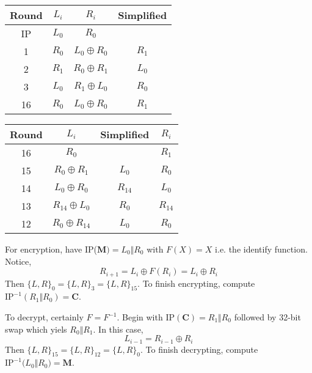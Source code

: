 \documentclass[../hw_sols.tex]{subfiles}
\begin{document}
\begin{description}
\begin{solution}
\begin{multicols}{2}
	\begin{center}
	\begin{tabular}{ c | c | c | c }
		\textbf{Round} & $L_i$ & $R_i$ & Simplified \\[2pt]  %
		\hline
		IP & $L_0$ & $R_0$            &       \\[5pt]
		 1 & $R_0$ & $L_0 \oplus R_0$ & $R_1$ \\[5pt]
		 2 & $R_1$ & $R_0 \oplus R_1$ & $L_0$ \\[5pt]
		 3 & $L_0$ & $R_1 \oplus L_0$ & $R_0$ \\[5pt]
		16 & $R_0$ & $L_0 \oplus R_0$ & $R_1$
	\end{tabular}
	\end{center}

	\begin{center}
	\begin{tabular}{ c | c | c | c }
		\textbf{Round} & $L_i$ & Simplified & $R_i$ \\[2pt]  %
		\hline
		16 &               $R_0$ &          & $R_1$    \\[5pt]
		15 &    $R_0 \oplus R_1$ &    $L_0$ & $R_0$    \\[5pt]
		14 &    $L_0 \oplus R_0$ & $R_{14}$ & $L_0$    \\[5pt]
		13 & $R_{14} \oplus L_0$ &    $R_0$ & $R_{14}$ \\[5pt]
		12 & $R_0 \oplus R_{14}$ &    $L_0$ & $R_0$
	\end{tabular}
	\end{center}
\end{multicols}

For encryption, have IP($\mathbf{M}) = L_0 \Vert R_0$ with $F(X) = X$ i.e. 
the identify function. Notice,
	\[ R_{i+1} = L_i \oplus F(R_i) = L_i \oplus R_i \]
Then $\{L,R\}_0 = \{L,R\}_3 = \{L,R\}_{15}$. To finish encrypting, compute
$\text{IP}^{-1}(R_1 \Vert R_0) = \mathbf{C}$.

To decrypt, certainly $F = F^{-1}$. Begin with 
$\text{IP}(\mathbf{C}) = R_1 \Vert R_0$ followed by 32-bit swap which yiels 
$R_0 \Vert R_1$. \newline
In this case,
	\[ L_{i-1} = R_{i-1} \oplus R_i \]
Then $\{L,R\}_{15} = \{L,R\}_{12} = \{L,R\}_{0}$. To finish decrypting, 
compute $\text{IP}^{-1}\big( L_0 \Vert R_0 \big) = \textbf{M}$.

\end{solution}

\end{description}
\end{document}
